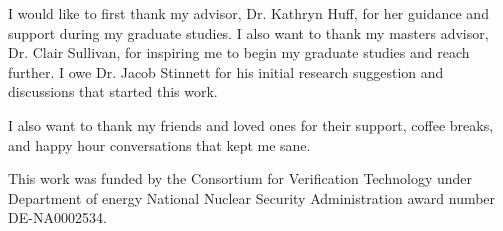 I would like to first thank my advisor, Dr. Kathryn Huff, for her guidance and support during my graduate studies. I also want to thank my masters advisor, Dr. Clair Sullivan, for inspiring me to begin my graduate studies and reach further. I owe Dr. Jacob Stinnett for his initial research suggestion and discussions that started this work.

I also want to thank my friends and loved ones for their support, coffee breaks, and happy hour conversations that kept me sane. 

This work was funded by the Consortium for Verification Technology under Department of energy National Nuclear Security Administration award number DE-NA0002534.